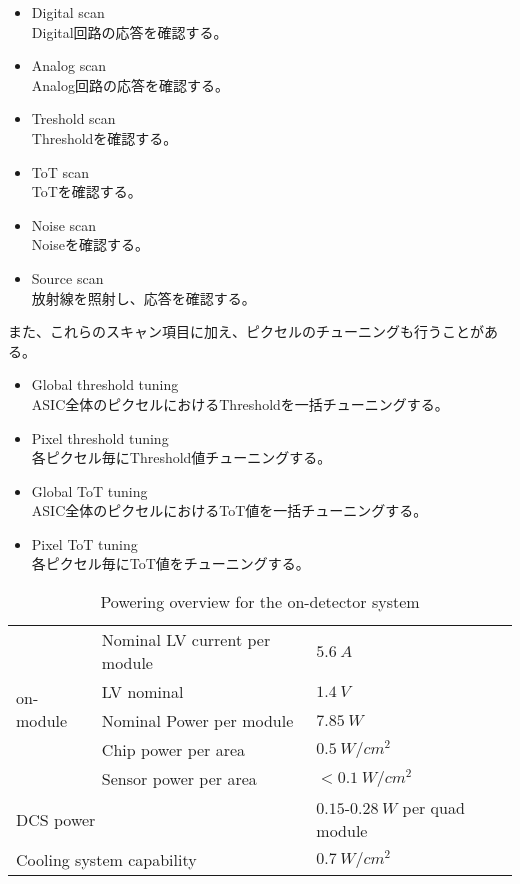 \begin{itemize}
  \item Digital scan \\
  Digital回路の応答を確認する。
  \item Analog scan \\
  Analog回路の応答を確認する。
  \item Treshold scan \\
  Thresholdを確認する。
  \item ToT scan \\
  ToTを確認する。
  \item Noise scan \\
  Noiseを確認する。
  \item Source scan \\
  放射線を照射し、応答を確認する。
\end{itemize}

また、これらのスキャン項目に加え、ピクセルのチューニングも行うことがある。
\begin{itemize}
  \item Global threshold tuning \\
  ASIC全体のピクセルにおけるThresholdを一括チューニングする。
  \item Pixel threshold tuning \\
  各ピクセル毎にThreshold値チューニングする。
  \item Global ToT tuning \\
  ASIC全体のピクセルにおけるToT値を一括チューニングする。
  \item Pixel ToT tuning \\
  各ピクセル毎にToT値をチューニングする。
\end{itemize}


\begin{table}[htbp]
  \begin{center}
    \caption[Powering overview for the on-detector system]{Powering overview for the on-detector system \cite{itk}}
    \label{tab:powering}
    \begin{tabular}{|l|l||l|}
    \hline
      \multirow{5}{*}{on-module} & Nominal LV current per module & $5.6\ \si{A}$ \\
    \cline{2-3}
      & LV nominal & $1.4\ \si{V}$ \\
    \cline{2-3}
      & Nominal Power per module & $7.85\ \si{W}$ \\
    \cline{2-3}
     & Chip power per area & $0.5\ \si{W/cm^2}$ \\
    \cline{2-3}
     & Sensor power per area & $< 0.1\ \si{W/cm^2}$ \\
    \hline
     \multicolumn{2}{|l||}{DCS power} & $0.15$-$0.28\ \si{W}$ per quad module \\
    \hline
     \multicolumn{2}{|l||}{Cooling system capability} & $0.7\ \si{W/cm^2}$ \\
    \hline
    \end{tabular}
  \end{center}
\end{table}



